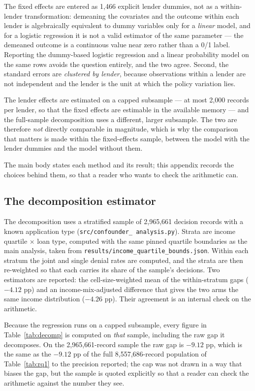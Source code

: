 \documentclass[sigconf,balance=false]{acmart}
\begin{document}
The fixed effects are entered as 1{,}466 explicit lender dummies, not as a
within-lender transformation: demeaning the covariates and the outcome
within each lender is algebraically equivalent to dummy variables only for
a \emph{linear} model, and for a logistic regression it is not a valid
estimator of the same parameter --- the demeaned outcome is a continuous
value near zero rather than a 0/1 label. Reporting the dummy-based logistic
regression and a linear probability model on the same rows avoids the
question entirely, and the two agree. Second, the standard errors are
\emph{clustered by lender}, because observations within a lender are not
independent and the lender is the unit at which the policy variation lies.

The lender effects are estimated on a capped subsample --- at most 2{,}000
records per lender, so that the fixed effects are estimable in the
available memory --- and the full-sample decomposition uses a different,
larger subsample. The two are therefore \emph{not} directly comparable in
magnitude, which is why the comparison that matters is made within the
fixed-effects sample, between the model with the lender dummies and the
model without them.


The main body states each method and its result; this appendix records the
choices behind them, so that a reader who wants to check the arithmetic can.

\subsection{The decomposition estimator}

The decomposition uses a stratified sample of 2{,}965{,}661 decision records
with a known application type (\texttt{src/confounder\_\allowbreak
analysis.py}). Strata are income quartile $\times$ loan type, computed with
the same pinned quartile boundaries as the main analysis, taken from
\texttt{results/income\_\allowbreak quartile\_\allowbreak bounds.json}.
Within each stratum the joint and single denial rates are computed, and the
strata are then re-weighted so that each carries its share of the sample's
decisions. Two estimators are reported: the cell-size-weighted mean of the
within-stratum gaps ($-4.12$ pp) and an income-mix-adjusted difference
that gives the two arms the same income distribution ($-4.26$ pp). Their
agreement is an internal check on the arithmetic.

Because the regression runs on a capped subsample, every figure in
Table~\ref{tab:decomp} is computed on \emph{that} sample, including the raw
gap it decomposes. On the 2{,}965{,}661-record sample the raw gap is
$-9.12$ pp, which is the same as the $-9.12$ pp of the full
8{,}557{,}686-record population of Table~\ref{tab:rq1} to the precision
reported; the cap was not drawn in a way that biases the gap, but the
sample is quoted explicitly so that a reader can check the arithmetic
against the number they see.
\end{document}

